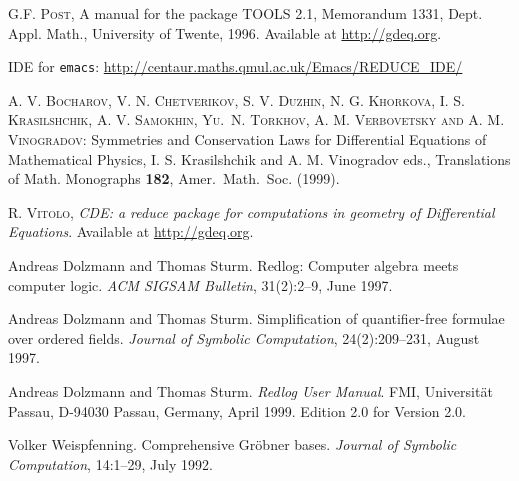 \begin{thebibliography}{999}
 \textsc{G.F. Post}, A manual for the package TOOLS 2.1,
    Memorandum 1331, Dept. Appl. Math., University of Twente, 1996. Available
    at \url{http://gdeq.org}.

 \REDUCE IDE for \texttt{emacs}:
    \url{http://centaur.maths.qmul.ac.uk/Emacs/REDUCE_IDE/}

 \textsc{A. V. Bocharov, V. N. Chetverikov, S. V.  Duzhin, N.
      G.  Khor{\cprime}kova, I. S.  Krasil{\cprime}shchik, A.  V.  Samokhin,
      Yu.\ N.  Torkhov, A. M. Verbovetsky and A. M.  Vinogradov}: Symmetries
    and Conservation Laws for Differential Equations of Mathematical Physics,
    I.  S.  Krasil{\cprime}shchik and A. M.  Vinogradov eds., Translations of
    Math.  Monographs \textbf{182}, Amer.\ Math.\ Soc. (1999).



 \textsc{R. Vitolo}, \emph{CDE: a reduce package for computations
  in geometry of Differential Equations}. Available at \url{http://gdeq.org}.



Andreas Dolzmann and Thomas Sturm.
\newblock Redlog: Computer algebra meets computer logic.
\newblock \emph{ACM SIGSAM Bulletin}, 31(2):2--9, June 1997.

Andreas Dolzmann and Thomas Sturm.
\newblock Simplification of quantifier-free formulae over ordered fields.
\newblock \emph{Journal of Symbolic Computation}, 24(2):209--231, August 1997.

Andreas Dolzmann and Thomas Sturm.
\newblock \emph{Redlog User Manual}.
\newblock FMI, Universit\"at Passau, D-94030 Passau, Germany, April 1999.
\newblock Edition 2.0 for Version 2.0.

Volker Weispfenning.
\newblock Comprehensive {G}r\"obner bases.
\newblock \emph{Journal of Symbolic Computation}, 14:1--29, July 1992.



\end{thebibliography}
